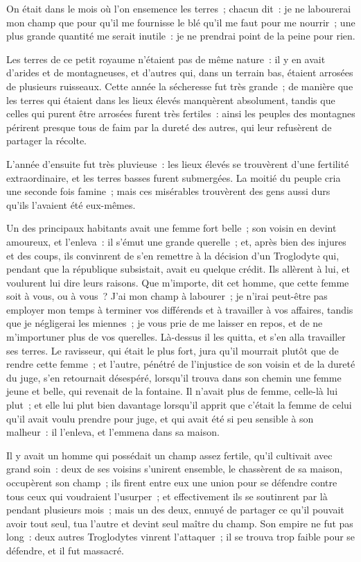 \documentclass[french,twoside]{book} %
\begin{document}
On était dans le mois où l’on ensemence les terres ; chacun dit : je ne labourerai mon champ que pour qu’il me fournisse le blé qu’il me faut pour me nourrir ; une plus grande quantité me serait inutile : je ne prendrai point de la peine pour rien.\par
Les terres de ce petit royaume n’étaient pas de même nature : il y en avait d’arides et de montagneuses, et d’autres qui, dans un terrain bas, étaient arrosées de plusieurs ruisseaux. Cette année la sécheresse fut très grande ; de manière que les terres qui étaient dans les lieux élevés manquèrent absolument, tandis que celles qui purent être arrosées furent très fertiles : ainsi les peuples des montagnes périrent presque tous de faim par la dureté des autres, qui leur refusèrent de partager la récolte.\par
L’année d’ensuite fut très pluvieuse : les lieux élevés se trouvèrent d’une fertilité extraordinaire, et les terres basses furent submergées. La moitié du peuple cria une seconde fois famine ; mais ces misérables trouvèrent des gens aussi durs qu’ils l’avaient été eux-mêmes.\par
Un des principaux habitants avait une femme fort belle ; son voisin en devint amoureux, et l’enleva : il s’émut une grande querelle ; et, après bien des injures et des coups, ils convinrent de s’en remettre à la décision d’un Troglodyte qui, pendant que la république subsistait, avait eu quelque crédit. Ils allèrent à lui, et voulurent lui dire leurs raisons. Que m’importe, dit cet homme, que cette femme soit à vous, ou à vous ? J’ai mon champ à labourer ; je n’irai peut-être pas employer mon temps à terminer vos différends et à travailler à vos affaires, tandis que je négligerai les miennes ; je vous prie de me laisser en repos, et de ne m’importuner plus de vos querelles. Là-dessus il les quitta, et s’en alla travailler ses terres. Le ravisseur, qui était le plus fort, jura qu’il mourrait plutôt que de rendre cette femme ; et l’autre, pénétré de l’injustice de son voisin et de la dureté du juge, s’en retournait désespéré, lorsqu’il trouva dans son chemin une femme jeune et belle, qui revenait de la fontaine. Il n’avait plus de femme, celle-là lui plut ; et elle lui plut bien davantage lorsqu’il apprit que c’était la femme de celui qu’il avait voulu prendre pour juge, et qui avait été si peu sensible à son malheur : il l’enleva, et l’emmena dans sa maison.\par
Il y avait un homme qui possédait un champ assez fertile, qu’il cultivait avec grand soin : deux de ses voisins s’unirent ensemble, le chassèrent de sa maison, occupèrent son champ ; ils firent entre eux une union pour se défendre contre tous ceux qui voudraient l’usurper ; et effectivement ils se soutinrent par là pendant plusieurs mois ; mais un des deux, ennuyé de partager ce qu’il pouvait avoir tout seul, tua l’autre et devint seul maître du champ. Son empire ne fut pas long : deux autres Troglodytes vinrent l’attaquer ; il se trouva trop faible pour se défendre, et il fut massacré.\par
\end{document}

